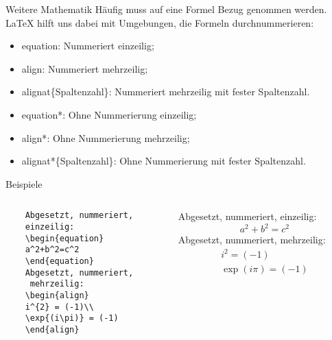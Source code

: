 \begin{frame}[fragile]{Weitere Mathematik}
Häufig muss auf eine Formel Bezug genommen werden. \LaTeX{} hilft uns dabei mit Umgebungen, die Formeln durchnummerieren:
\begin{itemize}
\item \textcolor{umg}{equation}: Nummeriert einzeilig;
\item \textcolor{umg}{align}: Nummeriert mehrzeilig;
\item \textcolor{umg}{alignat}\textrm{\{\textlangle Spaltenzahl\textrangle\}}: Nummeriert mehrzeilig mit fester Spaltenzahl.
\item \textcolor{umg}{equation*}: Ohne Nummerierung einzeilig;
\item \textcolor{umg}{align*}: Ohne Nummerierung mehrzeilig;
\item \textcolor{umg}{alignat*}\textrm{\{\textlangle Spaltenzahl\textrangle\}}: Ohne Nummerierung mit fester Spaltenzahl.
\end{itemize}
\end{frame}

\begin{frame}[fragile]{Beispiele}
\begin{columns}
\begin{column}{.48\textwidth}\footnotesize
\begin{codeblock}
\begin{verbatim}
	Abgesetzt, nummeriert, 
	einzeilig:
    \begin{equation}
    a^2+b^2=c^2
    \end{equation}
    Abgesetzt, nummeriert,
     mehrzeilig:
    \begin{align}
    i^{2} = (-1)\\
    \exp{(i\pi)} = (-1) 
    \end{align}
\end{verbatim}
\end{codeblock}
\end{column}
%
\begin{column}{.45\textwidth}		
	Abgesetzt, nummeriert, einzeilig:
    \begin{equation}
    a^2+b^2=c^2
    \end{equation}
    Abgesetzt, nummeriert, mehrzeilig:
    \begin{align}
    i^{2} = (-1)\\
    \exp{(i\pi)} = (-1) 
    \end{align}
\end{column}
\end{columns}
\end{frame}

